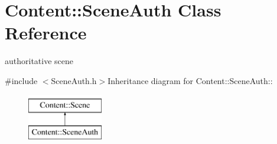 \hypertarget{classContent_1_1SceneAuth}{
\section{Content::SceneAuth Class Reference}
\label{classContent_1_1SceneAuth}
}


authoritative scene  


{\ttfamily \#include $<$SceneAuth.h$>$}Inheritance diagram for Content::SceneAuth::\begin{figure}[H]
\begin{center}
\leavevmode
\includegraphics[height=2cm]{classContent_1_1SceneAuth}
\end{center}
\end{figure}
